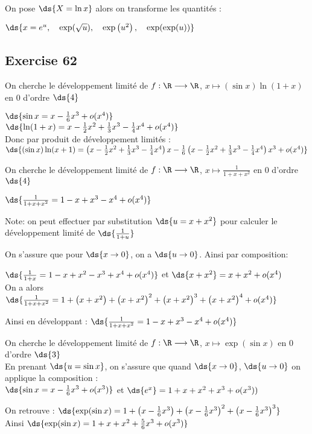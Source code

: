 \documentclass[11pt]{book}
\begin{document}
	On pose $\ds{X=\ln x}$ alors on transforme les quantités : \\
	\centerline{$\ds{x=e^u, \quad \exp(\sqrt{u} ), \quad \exp\left( u^2 \right), \quad \exp(\exp(u)) }$}

	\subsection{Exercise 62}

	On cherche le développement limité de $f: \R \longrightarrow \R$, $x \longmapsto (\sin x)\ln(1+x)$ en 0 d'ordre $\ds{4}$

	$\ds{\sin x = x - \frac{1}{6}x^3 +o(x^4)}$\\
	$\ds{\ln(1+x)= x -\frac{1}{2}x^2+ \frac{1}{3}x^3 - \frac{1}{4}x^4 + o(x^4)}$\\
	Donc par produit de développement limités :\\
	$\ds{(\sin x)\ln(x+1)= \left( x -\frac{1}{2}x^2+ \frac{1}{3}x^3 - \frac{1}{4}x^4  \right) x -\frac{1}{6}\left( x -\frac{1}{2}x^2+ \frac{1}{3}x^3 - \frac{1}{4}x^4  \right)x^3+o(x^4) }$

	On cherche le développement limité de $f: \R \longrightarrow \R$, $x \longmapsto \frac{1}{1+x+x^2}$ en 0 d'ordre $\ds{4}$

	$\ds{\frac{1}{1+x+x^2}= 1 - x +x^3 -x^4 + o(x^4) }$

	\begin{dent}{Note:} on peut effectuer par substitution $\ds{u=x+x^2}$ pour calculer le développement limité de $\ds{\frac{1}{1+u}}$

		On s'assure que pour $\ds{x\to 0}$, on a $\ds{u\to 0}$. Ainsi par composition:

		$\ds{\frac{1}{1+x}= 1-x+x^2-x^3 + x^4+ o(x^4)}$ et $\ds{x+x^2}= x+x^2 +o(x^4)$ \\
		On a  alors $\ds{\frac{1}{1+x+x^2}= 1+ \left( x+x^2 \right) + \left( x+x^2 \right)^2 + \left( x+x^2 \right) ^3 +\left( x+x^2 \right) ^4 + o(x^4) }$

		Ainsi en développant : $\ds{\frac{1}{1+x+x^2}= 1-x+x^3-x^4 +o(x^4)}$
		
	\end{dent}

	On cherche le développement limité de $f: \R \longrightarrow \R$, $x \longmapsto \exp(\sin x)$ en 0 d'ordre $\ds{3}$\\
	En prenant $\ds{u=\sin x}$, on s'assure que quand $\ds{x\to 0}$, $\ds{u\to 0}$ on applique la composition :\\
	$\ds{\sin x = x -\frac{1}{6}x^3 +o (x^3)}$ et $\ds{e^x}=1 +x+x^2+x^3+o(x^3))$

	On retrouve : $\ds{\exp(\sin x)= 1+ \left( x-\frac{1}{6}x^3 \right) +\left( x-\frac{1}{6}x^3 \right) ^2 + \left( x-\frac{1}{6}x^3 \right) ^3}$\\

	Ainsi $\ds{\exp(\sin x)= 1+x+x^2+\frac{5}{6}x^3 +o(x^3)}$
\end{document}
